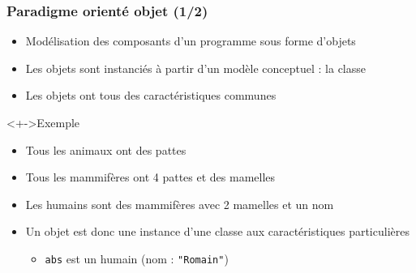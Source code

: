 \begin{frame}
\frametitle{Paradigme orienté objet (1/2)}
\begin{itemize}[<+->]
\item Modélisation des composants d'un programme sous forme d'objets
\item Les objets sont instanciés à partir d'un modèle conceptuel : la classe
\item Les objets ont tous des caractéristiques communes
\end{itemize}
\begin{exampleblock}<+->{Exemple}
	\begin{itemize}[<+->]
	\item Tous les animaux ont des pattes
	\item Tous les mammifères ont 4 pattes et des mamelles
	\item Les humains sont des mammifères avec 2 mamelles et un nom
	\end{itemize}
\end{exampleblock}
\begin{itemize}[<+->]
\item Un objet est donc une instance d'une classe aux caractéristiques particulières
	\begin{itemize}
	\item \texttt{abs} est un humain (nom : \lstinline|"Romain"|)
	\end{itemize}
\end{itemize}
\end{frame}

